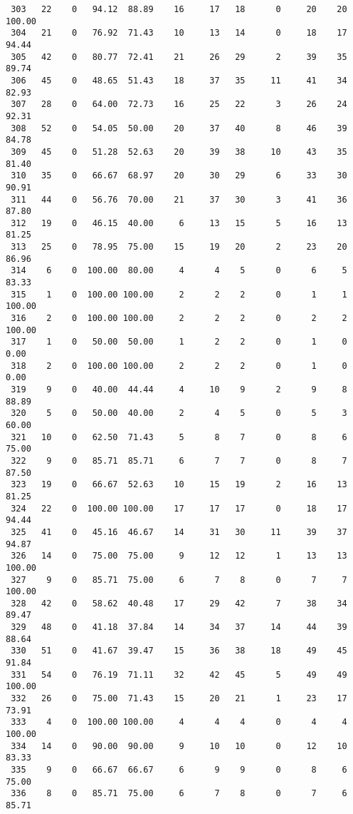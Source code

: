 \begin{verbatim}
 303   22    0   94.12  88.89    16     17   18      0     20    20   100.00
 304   21    0   76.92  71.43    10     13   14      0     18    17    94.44
 305   42    0   80.77  72.41    21     26   29      2     39    35    89.74
 306   45    0   48.65  51.43    18     37   35     11     41    34    82.93
 307   28    0   64.00  72.73    16     25   22      3     26    24    92.31
 308   52    0   54.05  50.00    20     37   40      8     46    39    84.78
 309   45    0   51.28  52.63    20     39   38     10     43    35    81.40
 310   35    0   66.67  68.97    20     30   29      6     33    30    90.91
 311   44    0   56.76  70.00    21     37   30      3     41    36    87.80
 312   19    0   46.15  40.00     6     13   15      5     16    13    81.25
 313   25    0   78.95  75.00    15     19   20      2     23    20    86.96
 314    6    0  100.00  80.00     4      4    5      0      6     5    83.33
 315    1    0  100.00 100.00     2      2    2      0      1     1   100.00
 316    2    0  100.00 100.00     2      2    2      0      2     2   100.00
 317    1    0   50.00  50.00     1      2    2      0      1     0     0.00
 318    2    0  100.00 100.00     2      2    2      0      1     0     0.00
 319    9    0   40.00  44.44     4     10    9      2      9     8    88.89
 320    5    0   50.00  40.00     2      4    5      0      5     3    60.00
 321   10    0   62.50  71.43     5      8    7      0      8     6    75.00
 322    9    0   85.71  85.71     6      7    7      0      8     7    87.50
 323   19    0   66.67  52.63    10     15   19      2     16    13    81.25
 324   22    0  100.00 100.00    17     17   17      0     18    17    94.44
 325   41    0   45.16  46.67    14     31   30     11     39    37    94.87
 326   14    0   75.00  75.00     9     12   12      1     13    13   100.00
 327    9    0   85.71  75.00     6      7    8      0      7     7   100.00
 328   42    0   58.62  40.48    17     29   42      7     38    34    89.47
 329   48    0   41.18  37.84    14     34   37     14     44    39    88.64
 330   51    0   41.67  39.47    15     36   38     18     49    45    91.84
 331   54    0   76.19  71.11    32     42   45      5     49    49   100.00
 332   26    0   75.00  71.43    15     20   21      1     23    17    73.91
 333    4    0  100.00 100.00     4      4    4      0      4     4   100.00
 334   14    0   90.00  90.00     9     10   10      0     12    10    83.33
 335    9    0   66.67  66.67     6      9    9      0      8     6    75.00
 336    8    0   85.71  75.00     6      7    8      0      7     6    85.71

\end{verbatim}
